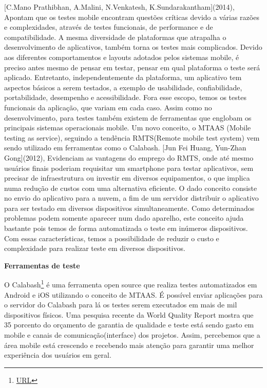[C.Mano Prathibhan, A.Malini, N.Venkatesh, K.Sundarakantham](2014), Apontam que os testes mobile encontram questões críticas devido a várias razões e complexidades, através de testes funcionais, de performance e de compatibilidade.
A mesma diversidade de plataformas que atrapalha o desenvolvimento de aplicativos, também torna os testes mais complicados. Devido aos diferentes comportamentos e layouts adotados pelos sistemas mobile, é preciso antes mesmo de pensar em testar, pensar em qual plataforma o teste será aplicado. Entretanto, independentemente da plataforma, um aplicativo tem aspectos básicos a serem testados, a exemplo de usabilidade, confiabilidade, portabilidade, desempenho e acessibilidade. Fora esse escopo, temos os testes funcionais da aplicação, que variam em cada caso.
Assim como no desenvolvimento, para testes também existem de ferramentas que englobam os principais sistemas operacionais mobile. Um novo conceito, o  MTAAS (Mobile testing as service), seguindo a tendência RMTS(Remote mobile test system) vem sendo utilizado em ferramentas como o Calabash.
[Jun Fei Huang, Yun-Zhan Gong](2012), Evidenciam as vantagens do emprego do RMTS, onde até mesmo usuários finais poderiam requisitar um smartphone para testar aplicativos, sem precisar de infraestrutura ou investir em diversos equipamentos, o que implica numa redução de custos com uma alternativa eficiente. 
O dado conceito consiste no envio do aplicativo para a nuvem, a fim de um servidor distribuir o aplicativo para ser testado em diversos dispositivos simultaneamente. Como determinados problemas podem somente aparecer num dado aparelho, este conceito ajuda bastante pois temos de forma automatizada o teste em inúmeros dispositivos. Com essas características, temos a possibilidade de reduzir o custo e complexidade para realizar teste em diversos dispositivos.

\textbf{Ferramentas de teste}

O Calabash\footnote{\url{URL}} é uma ferramenta open source que realiza testes automatizados em Android e iOS utilizando o conceito de MTAAS. É possível enviar aplicações para o servidor do Calabash para lá os testes serem executados em mais de mil dispositivos físicos. 
Uma pesquisa recente da World Quality Report mostra que 35 porcento do orçamento de garantia de qualidade e teste está sendo gasto em mobile e canais de comunicação(interface) dos projetos. Assim, percebemos que a área mobile está crescendo e recebendo mais atenção para garantir uma melhor experiência dos usuários em geral.
